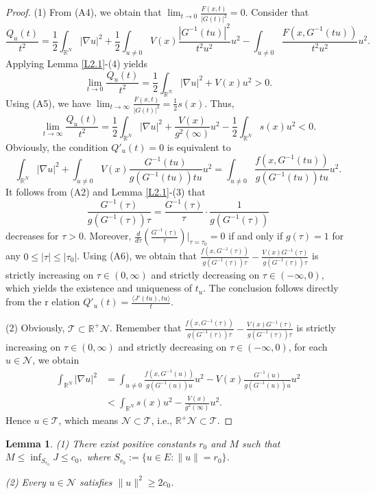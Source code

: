 \documentclass[10pt,a4paper]{amsart}
\numberwithin{equation}{section}
\newtheorem{lemma}[theorem]{Lemma}
\begin{document}
\begin{proof}
 (1) From (A4), we obtain that
$\lim_{t\to 0}\frac{F(x,t)}{|G(t)|^2}=0$.
Consider that
$$
\frac{Q_u(t)}{t^2}=\frac{1}{2}\int_{\mathbb{R}^N}|\nabla u|^2+\frac{1}{2}\int_{u\neq 0}V(x)\frac{|G^{-1}(tu)|^2}{t^2u^2}u^2-\int_{u\neq 0}\frac{F(x,G^{-1}(tu))}{t^2u^2}u^2.
$$
Applying Lemma \ref{L2.1}-(4) yields 
$$
\lim_{t\to 0}\frac{Q_u(t)}{t^2}=\frac{1}{2}\int_{\mathbb{R}^N}|\nabla u|^2+V(x)u^2>0.
$$
 Using (A5), we have
$\lim_{t\to\infty}\frac{F(x,t)}{|G(t)|^2}=\frac{1}{2}s(x)$. Thus,
$$
\lim_{t\to\infty}\frac{Q_u(t)}{t^2}= \frac{1}{2}\int_{\mathbb{R}^N}|\nabla u|^2
+\frac{V(x)}{g^2(\infty)}u^2-\frac{1}{2}\int_{\mathbb{R}^N}s(x)u^2<0.
$$
Obviously, the condition $Q'_u(t) = 0$ is equivalent to
$$
\int_{\mathbb{R}^N}|\nabla u|^2+\int_{u\neq 0}V(x)\frac{G^{-1}(tu)}{g(G^{-1}(tu))tu}u^2
=\int_{u\neq 0}\frac{f(x,G^{-1}(tu))}{g(G^{-1}(tu))tu}u^2.
$$
It follows from (A2) and Lemma \ref{L2.1}-(3) that 
$$
\frac{G^{-1}(\tau)}{g(G^{-1}(\tau))\tau}=\frac{G^{-1}(\tau)}{\tau}\cdot \frac{1}{g(G^{-1}(\tau))}
$$
decreases for $\tau > 0$. Moreover, $\frac{d}{d\tau}(\frac{G^{-1}(\tau)}{\tau})|_{\tau=\tau_0}=0$ 
if and only if $g(\tau)=1$ for any $0\leq |\tau|\leq |\tau_0|$. Using (A6), we obtain that 
$\frac{f(x,G^{-1}(\tau))}{g(G^{-1}(\tau))\tau}-\frac{V(x)G^{-1}(\tau)}{g(G^{-1}(\tau))\tau}$ 
is strictly increasing on $\tau\in(0,\infty)$ and strictly decreasing on $\tau\in(-\infty,0)$, 
which yields the existence and uniqueness of $t_u$. The conclusion follows directly from  the r
elation $Q'_u(t) = \frac{\langle J'(tu), tu \rangle}{t}$.
 
(2) Obviously, $\mathcal{T}\subset\mathbb{R}^+\mathcal{N}$. Remember that  
$\frac{f(x,G^{-1}(\tau))}{g(G^{-1}(\tau))\tau}-\frac{V(x)G^{-1}(\tau)}{g(G^{-1}(\tau))\tau}$ is strictly 
increasing on $\tau\in(0,\infty)$ and strictly decreasing on $\tau\in(-\infty,0)$, for each  \( u \in \mathcal{N} \), we obtain
\begin{align*}
\int_{\mathbb{R}^N}|\nabla u|^2 
&= \int_{u\neq 0}\frac{f(x,G^{-1}(u))}{g(G^{-1}(u))u}u^2-V(x)\frac{G^{-1}(u)}{g(G^{-1}(u))u}u^2\\
&< \int_{\mathbb{R}^N}s(x)u^2-\frac{V(x)}{g^2(\infty)}u^2.
\end{align*}
Hence $u\in\mathcal{T}$, which means $\mathcal{N}\subset\mathcal{T}$, i.e., 
$\mathbb{R}^+\mathcal{N}\subset\mathcal{T}$.
\end{proof}


\begin{lemma}\label{L3.3} 
(1) There exist positive constants $r_0$ and $M$ such that $M\leq \inf_{S_{r_0}}J\leq c_0,$ where $S_{r_0}:=\{u\in E:\|u\|=r_0\}$.

(2) Every $u\in \mathcal{N}$ satisfies $\|u\|^{2}\geq 2c_0$.
\end{lemma}
\end{document}
